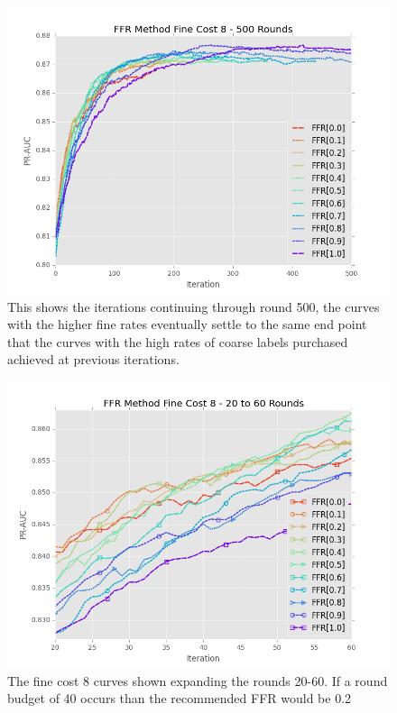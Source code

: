 \documentclass[ms]{nuthesis}
\begin{document}
\FloatBarrier
\begin{figure}[!htb]
	\centering
    \includegraphics[width=1.0\columnwidth]{fig/ParamsFFR_PR_Cost8_rnds0_500}
    \caption{This shows the iterations continuing through round 500, the curves
    with the higher fine rates eventually settle to the same end point that the
    curves with the high rates of coarse labels purchased achieved at previous
    iterations.}
    \label{fig:ParamsFFR_PR_Cost8_rnds0_500}
\end{figure}
\FloatBarrier

\FloatBarrier
\begin{figure}[!htb]
	\centering
    \includegraphics[width=1.0\columnwidth]{fig/ParamsFFR_PR_Cost8_rnds20_60}
    \caption{The fine cost 8 curves shown expanding the rounds 20-60. If a round budget of 40
    occurs than the recommended FFR would be 0.2}
    \label{fig:ParamsFFR_PR_Cost8_rnds20_60}
\end{figure}
\FloatBarrier
\end{document}
